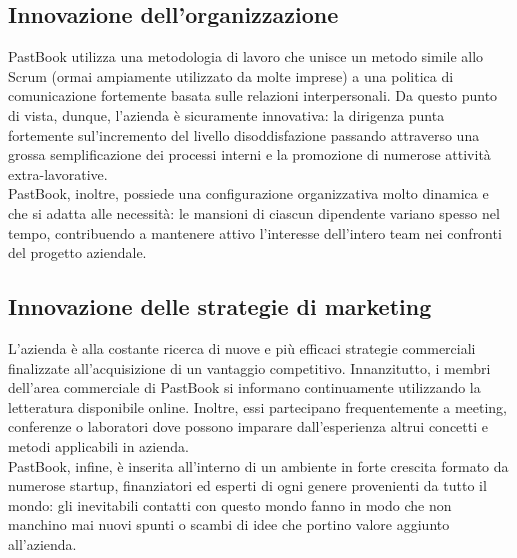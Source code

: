 		\subsection{Innovazione dell'organizzazione}
			PastBook utilizza una metodologia di lavoro che unisce un metodo simile allo Scrum (ormai ampiamente utilizzato da molte
			imprese) a una politica di comunicazione fortemente basata sulle relazioni interpersonali. Da questo punto di vista, dunque,
			l'azienda è sicuramente innovativa: la dirigenza punta fortemente sul'incremento del livello disoddisfazione passando
			attraverso una grossa semplificazione dei processi interni e la promozione di numerose attività extra-lavorative.\\
			PastBook, inoltre, possiede una configurazione organizzativa molto dinamica e che si adatta alle necessità: le mansioni di
			ciascun dipendente variano spesso nel tempo, contribuendo a mantenere attivo l'interesse dell'intero team nei confronti del
			progetto aziendale.
		\subsection{Innovazione delle strategie di marketing}
			L'azienda è alla costante ricerca di nuove e più efficaci strategie commerciali finalizzate all'acquisizione di un vantaggio
			competitivo. Innanzitutto, i membri dell'area commerciale di PastBook si informano continuamente utilizzando la letteratura
			disponibile online. Inoltre, essi partecipano frequentemente a meeting, conferenze o laboratori dove possono imparare
			dall'esperienza altrui concetti e metodi applicabili in azienda.\\
			PastBook, infine, è inserita all'interno di un ambiente in forte crescita formato da numerose startup, finanziatori ed
			esperti di ogni genere provenienti da tutto il mondo: gli inevitabili contatti con questo mondo fanno in modo che non
			manchino mai nuovi spunti o scambi di idee che portino valore aggiunto all'azienda.
